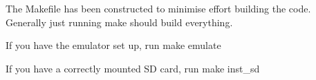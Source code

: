 The Makefile has been constructed to minimise effort building the code. Generally just running {\ttfamily make} should build everything.

If you have the emulator set up, run {\ttfamily make emulate}

If you have a correctly mounted SD card, run {\ttfamily make inst\+\_\+sd} 